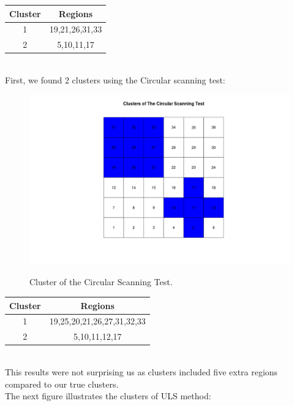 \documentclass[12pt]{article}
\begin{document}
\hspace{4cm}\begin{tabular}{|c|c|}
	\hline
	Cluster & Regions \\
	\hline
	1 & 19,21,26,31,33 \\
	2 & 5,10,11,17 \\ \hline
\end{tabular} \\

First, we found 2 clusters using the Circular scanning test:\\


\begin{figure}[!ht]
	
	\centering
	\includegraphics[scale=0.2]{Ex2_Circular}\\
	\caption{Cluster of the Circular Scanning Test.\label{f:gull}}
	
\end{figure}

\hspace{4cm}\begin{tabular}{|c|c|}
	\hline
	Cluster & Regions \\
	\hline
	1 & 19,25,20,21,26,27,31,32,33 \\
	2 & 5,10,11,12,17 \\ 
	 \hline
\end{tabular} \\

This results were not surprising us as clusters included five extra regions compared to our true clusters.\\

The next figure illustrates the clusters of ULS method: \\ 
\end{document}
